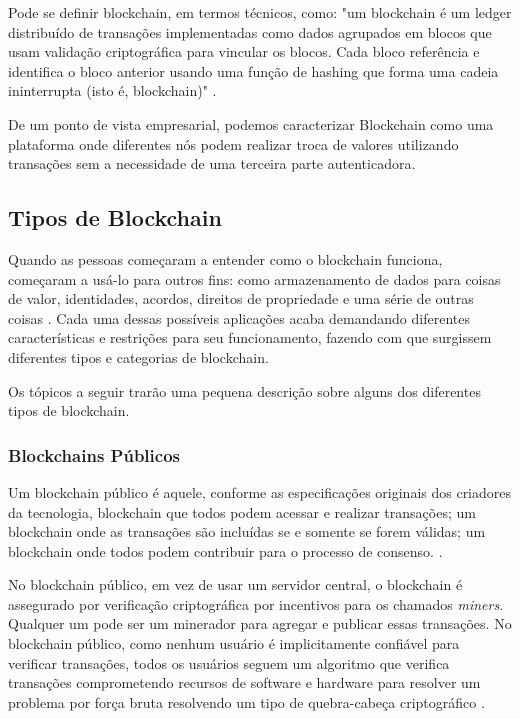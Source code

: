     Pode se definir blockchain, em termos técnicos, como: "um blockchain é um ledger distribuído de transações implementadas como dados agrupados em blocos que usam validação criptográfica para vincular os blocos. Cada bloco referência e identifica o bloco anterior usando uma função de hashing que forma uma cadeia ininterrupta (isto é, blockchain)" \cite{blockchain_pratical_guide}.
    
    De um ponto de vista empresarial, podemos caracterizar Blockchain como uma plataforma onde diferentes nós podem realizar troca de valores utilizando transações sem a necessidade de uma terceira parte autenticadora.
    
    
    
    \subsection{Tipos de Blockchain}
    \label{subsection_tipos_blockchain}

    Quando as pessoas começaram a entender como o blockchain funciona, começaram a usá-lo para outros fins: como armazenamento de dados para coisas de valor, identidades, acordos, direitos de propriedade e uma série de outras coisas \cite{blockchain_pratical_guide}. Cada uma dessas possíveis aplicações acaba demandando diferentes características e restrições para seu funcionamento, fazendo com que surgissem diferentes tipos e categorias de blockchain.
    
    Os tópicos a seguir trarão uma pequena descrição sobre alguns dos diferentes tipos de blockchain.
    
    
    \subsubsection{Blockchains Públicos}
    
    Um blockchain público é aquele, conforme as especificações originais dos criadores da tecnologia, blockchain que todos podem acessar e realizar transações; um blockchain onde as transações são incluídas se e somente se forem válidas; um blockchain onde todos podem contribuir para o processo de consenso. \cite{blockchain_pratical_guide}.
    
    No blockchain público, em vez de usar um servidor central, o blockchain é assegurado por verificação criptográfica por incentivos para os chamados \textit{miners}. Qualquer um pode ser um minerador para agregar e publicar essas transações. No blockchain público, como nenhum usuário é implicitamente confiável para verificar transações, todos os usuários seguem um algoritmo que verifica transações comprometendo recursos de software e hardware para resolver um problema por força bruta resolvendo um tipo de quebra-cabeça criptográfico \cite{blockchain_pratical_guide}.
    

